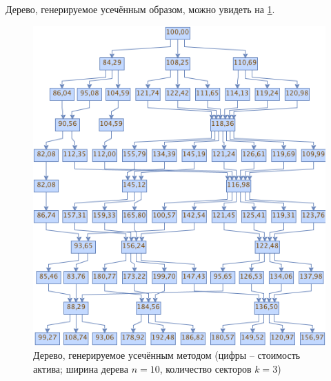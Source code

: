\documentclass[12pt,twoside,titlepage,сa4paper]{article}
\begin{document}
	Дерево, генерируемое усечённым образом, можно увидеть на \ref{fig:linearTree}. 
	\begin{figure}[h]
		\includegraphics[width=\textwidth]{linear_tree}
		\caption{Дерево, генерируемое усечённым методом (цифры -- стоимость актива; ширина дерева $n=10$, количество секторов $k=3$)}
		\label{fig:linearTree}
	\end{figure}
\end{document}
